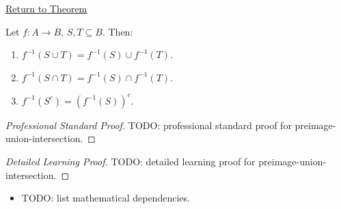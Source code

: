 \newpage
{}
\label{prf:preimage-union-intersection}

\begin{remark*}[Return]
\hyperref[prop:preimage-union-intersection]{Return to Theorem}
\end{remark*}

\begin{proposition*}
Let $f:A\to B$, $S,T\subseteq B$. Then:
\begin{enumerate}[label=(\roman*)]
  \item $f^{-1}(S\cup T)=f^{-1}(S)\cup f^{-1}(T)$.
  \item $f^{-1}(S\cap T)=f^{-1}(S)\cap f^{-1}(T)$.
  \item $f^{-1}(S^c)=(f^{-1}(S))^c$.
\end{enumerate}

\smallskip\noindent
\end{proposition*}

\begin{proof}[Professional Standard Proof]
\LRAProofBodyStart
TODO: professional standard proof for preimage-union-intersection.
\end{proof}

\begin{proof}[Detailed Learning Proof]
\LRAProofBodyStart
TODO: detailed learning proof for preimage-union-intersection.
\end{proof}

\begin{remark*}
\end{remark*}

\begin{dependencies}
\begin{itemize}
  \item TODO: list mathematical dependencies.
\end{itemize}
\end{dependencies}

\clearpage
